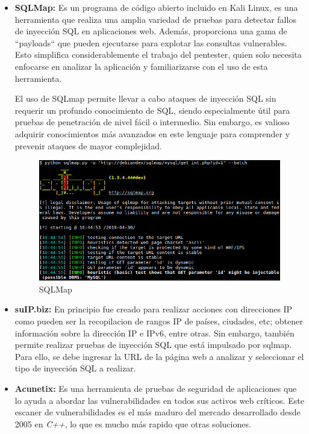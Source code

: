 \documentclass[11pt]{report}
\begin{document}
\begin{itemize}
  \item \textbf{SQLMap:} Es un programa de código abierto incluido en Kali Linux, es una herramienta que realiza una amplia variedad de
  pruebas para detectar fallos de inyección SQL en aplicaciones web. Además, proporciona una gama de “payloads“ que pueden
  ejecutarse para explotar las consultas vulnerables. Esto simplifica considerablemente el trabajo del pentester, quien
  solo necesita enfocarse en analizar la aplicación y familiarizarse con el uso de esta herramienta.
  
  El uso de SQLmap permite llevar a cabo ataques de inyección SQL sin requerir un profundo conocimiento de SQL, siendo
  especialmente útil para pruebas de penetración de nivel fácil o intermedio. Sin embargo, es valioso adquirir conocimientos
  más avanzados en este lenguaje para comprender y prevenir ataques de mayor complejidad.
  
  \begin{figure}[H]
    \centering
    \includegraphics[scale=0.4]{img/sqlmap.png}
    \caption{SQLMap}
    \label{fig:sqlmap}
  \end{figure}

  \item \textbf{suIP.biz:} En principio fue creado para realizar acciones con direcciones IP como pueden ser la recopilacion
  de rangos IP de países, ciudades, etc; obtener información sobre la dirección IP e IPv6, entre otras. Sin embargo, también
  permite realizar pruebas de inyección SQL que está impulsado por sqlmap. Para ello, se debe ingresar la URL de la página
  web a analizar y seleccionar el tipo de inyección SQL a realizar.

  \item \textbf{Acunetix:} Es una herramienta de pruebas de seguridad de aplicaciones que lo ayuda a abordar las vulnerabilidades
  en todos sus activos web críticos. Este escaner de vulnerabilidades es el más maduro del mercado desarrollado desde 2005 en \emph{C++},
  lo que es mucho más rapido que otras soluciones.


\end{itemize}
\end{document}
